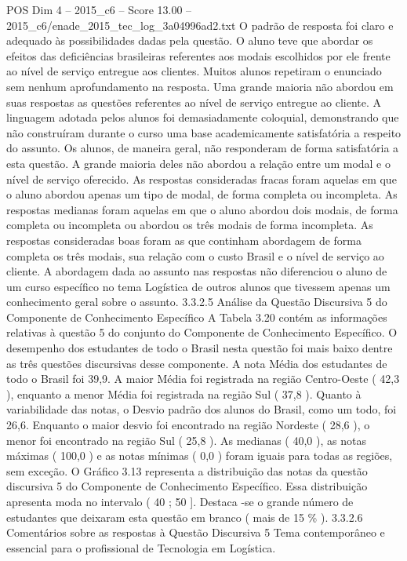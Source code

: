 \begin{textsample}{POS Dim 4 – 2015\_c6 – Score 13.00 – 2015\_c6/enade\_2015\_tec\_log\_3a04996ad2.txt}
O padrão de resposta foi claro e adequado às possibilidades dadas pela questão.
O aluno teve que abordar os efeitos das deficiências brasileiras referentes aos modais escolhidos por ele frente ao nível de serviço entregue aos clientes.
Muitos alunos repetiram o enunciado sem nenhum aprofundamento na resposta.
Uma grande maioria não abordou em suas respostas as questões referentes ao nível de serviço entregue ao cliente.
A linguagem adotada pelos alunos foi demasiadamente coloquial, demonstrando que não construíram durante o curso uma base academicamente satisfatória a respeito do assunto.
Os alunos, de maneira geral, não responderam de forma satisfatória a esta questão.
A grande maioria deles não abordou a relação entre um modal e o nível de serviço oferecido.
As respostas consideradas fracas foram aquelas em que o aluno abordou apenas um tipo de modal, de forma completa ou incompleta.
As respostas medianas foram aquelas em que o aluno abordou dois modais, de forma completa ou incompleta ou abordou os três modais de forma incompleta.
As respostas consideradas boas foram as que continham abordagem de forma completa os três modais, sua relação com o custo Brasil e o nível de serviço ao cliente.
A abordagem dada ao assunto nas respostas não diferenciou o aluno de um curso específico no tema Logística de outros alunos que tivessem apenas um conhecimento geral sobre o assunto. 3.3.2.5 Análise da Questão Discursiva 5 do Componente de Conhecimento Específico A Tabela 3.20 contém as informações relativas à questão 5 do conjunto do Componente de Conhecimento Específico.
O desempenho dos estudantes de todo o Brasil nesta questão foi mais baixo dentre as três questões discursivas desse componente.
A nota Média dos estudantes de todo o Brasil foi 39,9.
A maior Média foi registrada na região Centro-Oeste ( 42,3 ), enquanto a menor Média foi registrada na região Sul ( 37,8 ).
Quanto à variabilidade das notas, o Desvio padrão dos alunos do Brasil, como um todo, foi 26,6.
Enquanto o maior desvio foi encontrado na região Nordeste ( 28,6 ), o menor foi encontrado na região Sul ( 25,8 ).
As medianas ( 40,0 ), as notas máximas ( 100,0 ) e as notas mínimas ( 0,0 ) foram iguais para todas as regiões, sem exceção.
O Gráfico 3.13 representa a distribuição das notas da questão discursiva 5 do Componente de Conhecimento Específico.
Essa distribuição apresenta moda no intervalo ( 40 ; 50 ].
Destaca -se o grande número de estudantes que deixaram esta questão em branco ( mais de 15 \% ). 3.3.2.6 Comentários sobre as respostas à Questão Discursiva 5 Tema contemporâneo e essencial para o profissional de Tecnologia em Logística.

\end{textsample}

